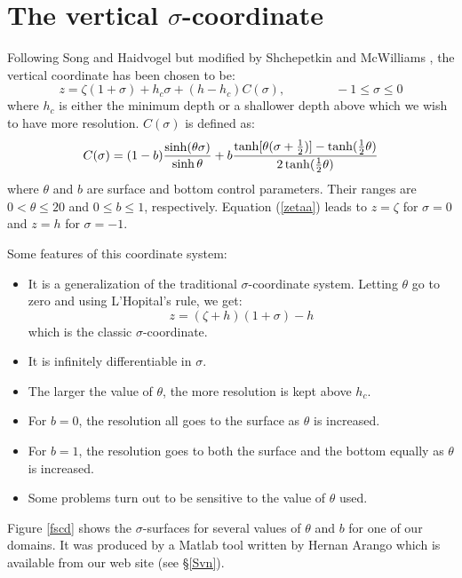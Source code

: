 \section{The vertical $\sigma$-coordinate}
\label{Scoord}

Following Song and Haidvogel \cite{Song94} but modified by
Shchepetkin and McWilliams \cite{SS2005}, the vertical coordinate has
been chosen to be:
\begin{equation}
   z = \zeta ( 1+\sigma) + h_c \sigma + (h - h_c) C(\sigma),
   \qquad \qquad -1 \leq \sigma \leq 0
\label{zetaa}
\end{equation}
where $h_c$ is either the minimum depth or a shallower depth above
which we wish to have more resolution.  $C(\sigma)$ is defined as:
\begin{equation}
   C(\sigma) = (1 - b) {\sinh (\theta \sigma) \over \sinh \theta } +
   b { \tanh [\theta ( \sigma + {1\over 2})] -
   \tanh ( {1\over 2} \theta) \over 
   2 \tanh ( {1\over 2} \theta) }
\end{equation}
where $\theta$ and $b$ are surface and bottom control parameters.
Their ranges are $0 < \theta \leq 20$ and $0 \leq b \leq 1$,
respectively.  Equation (\ref{zetaa}) leads to $z = \zeta$ for
$\sigma = 0$ and $z = h$ for $\sigma = -1$.

Some features of this coordinate system:
\begin{itemize}
   \item It is a generalization of the traditional $\sigma$-coordinate
   system.  Letting $\theta$ go to zero and using L'Hopital's rule,
   we get:
   \begin{equation}
      z = (\zeta + h)(1 + \sigma) - h
   \end{equation}
   which is the classic $\sigma$-coordinate.
   \item It is infinitely differentiable in $\sigma$.
   \item The larger the value of $\theta$, the more resolution is kept
   above $h_c$.
   \item For $b = 0$, the resolution all goes to the surface as
   $\theta$ is increased.
   \item For $b = 1$, the resolution goes to both the surface and the
   bottom equally as $\theta$ is increased.
   \item Some problems turn out to be sensitive to the value of
   $\theta$ used.
\end{itemize}
Figure \ref{fscd} shows the $\sigma$-surfaces for several values of $\theta$
and $b$ for one of our domains.  It was produced by a Matlab tool
written by Hernan Arango which is available from our web site (see
\S\ref{Svn}).

